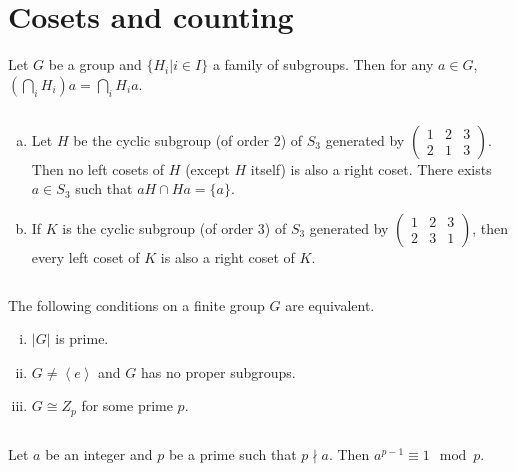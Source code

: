 \section{Cosets and counting}
\begin{ex}
    Let $G$ be a group and $\{H_{i}|i\in I\}$ a family of subgroups. Then for any $a\in G$, $(\bigcap\limits_{i}H_{i})a=\bigcap\limits_{i}H_{i}a$.
\end{ex}

$$ $$

\begin{ex}
    \begin{enumerate}[(a)]
        \item Let $H$ be the cyclic subgroup (of order 2) of $S_{3}$ generated by $\begin{pmatrix}
            1 & 2 &3\\2& 1&3
        \end{pmatrix}$. Then no left cosets of $H$ (except $H$ itself) is also a right coset. There exists $a\in S_{3}$ such that $aH\cap Ha=\{a\}$.
        \item If $K$ is the cyclic subgroup (of order 3) of $S_{3}$ generated by $\begin{pmatrix}
            1 & 2&3\\2& 3 &1
        \end{pmatrix}$, then every left coset of $K$ is also a right coset of $K$.
    \end{enumerate}
\end{ex}

$$ $$

\begin{ex}
    The following conditions on a finite group $G$ are equivalent.
    \begin{enumerate}[(i)]
        \item $\left| G \right| $ is prime.
        \item $G\neq \left\langle e\right\rangle$ and $G$ has no proper subgroups.
        \item $G\cong Z_{p}$ for some prime $p$.
    \end{enumerate}
\end{ex}

$$ $$

\begin{ex}
    Let $a$ be an integer and $p$ be a prime such that $p\nmid a$. Then $a^{p-1}\equiv 1\mod p$.
\end{ex}

$$ $$

